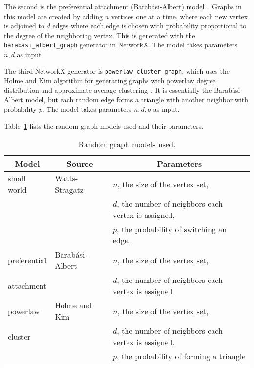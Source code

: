 \documentclass[runningheads,a4paper]{llncs}
\begin{document}
The second is the preferential attachment (Barab\'{a}si-Albert)
model~\cite{barabasialbert}.  Graphs in this model are created by adding $n$
vertices one at a time, where each new vertex is adjoined to $d$ edges where
each edge is chosen with probability proportional to the degree of the
neighboring vertex.  This is generated with the \texttt{barabasi_albert_graph}
generator in NetworkX.  The model takes parameters $n, d$ as input.

The third NetworkX generator is \texttt{powerlaw_cluster_graph}, which uses the
Holme and Kim algorithm for generating graphs with powerlaw degree distribution
and approximate average clustering~\cite{holmekim}.  It is essentially the
Barab\'{a}si-Albert model, but each random edge forms a triangle with another
neighbor with probability $p$.  The model takes parameters $n, d, p$ as input.

Table~\ref{table:randomgraphs} lists the random graph models used and their
parameters.

\begin{table}
\begin{tabular}{|l|l|l|}
\hline
\multicolumn{1}{|c|}{Model} & \multicolumn{1}{|c|}{Source} & \multicolumn{1}{|c|}{Parameters}\\
\hline\hline
small world & Watts-Stragatz\cite{wattsstrogatz} & $n$, the size of the vertex set,\\
            &                & $d$, the number of neighbors each vertex is
assigned,\\
            &                & $p$, the probability of switching an edge.\\
\hline
preferential& Barab\'{a}si-Albert\cite{barabasialbert} & $n$, the size of the
vertex set,\\
attachment  &                                          & $d$, the number of
neighbors each vertex is assigned\\
\hline
powerlaw    & Holme and Kim~\cite{holmekim} & $n$, the size of the vertex set,\\
cluster     &                               & $d$, the number of neighbors each
vertex is assigned,\\
            &                               & $p$, the probability of forming a
triangle\\
\hline
\end{tabular}
\caption{Random graph models used.}
\label{table:randomgraphs}
\end{table}
\end{document}
